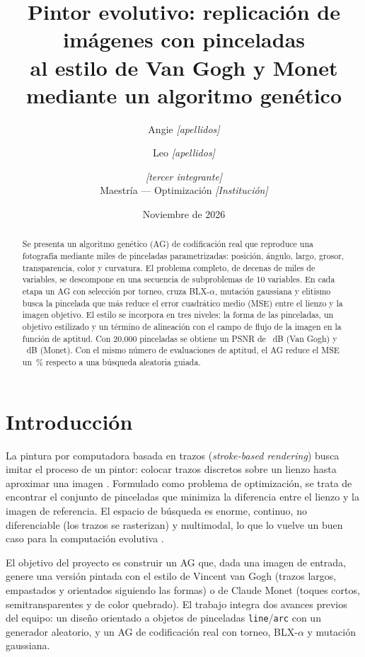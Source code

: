 \documentclass[10pt,letterpaper]{article}
\title{\vspace{-1.2cm}\textbf{Pintor evolutivo: replicación de imágenes con pinceladas\\ al estilo de Van Gogh y Monet mediante un algoritmo genético}}
\author{Angie \textit{[apellidos]} \and Leo \textit{[apellidos]} \and \textit{[tercer integrante]}\\[2pt]
\small Maestría --- Optimización \quad \small\textit{[Institución]}}
\date{\small Noviembre de 2026}
\begin{document}
\maketitle
\vspace{-0.6cm}

\begin{abstract}
\noindent Se presenta un algoritmo genético (AG) de codificación real que reproduce una fotografía mediante miles de pinceladas parametrizadas: posición, ángulo, largo, grosor, transparencia, color y curvatura. El problema completo, de decenas de miles de variables, se descompone en una secuencia de subproblemas de 10 variables. En cada etapa un AG con selección por torneo, cruza BLX-$\alpha$, mutación gaussiana y elitismo busca la pincelada que más reduce el error cuadrático medio (MSE) entre el lienzo y la imagen objetivo. El estilo se incorpora en tres niveles: la forma de las pinceladas, un objetivo estilizado y un término de alineación con el campo de flujo de la imagen en la función de aptitud. Con 20{,}000 pinceladas se obtiene un PSNR de \vgPSNR~dB (Van Gogh) y \moPSNR~dB (Monet). Con el mismo número de evaluaciones de aptitud, el AG reduce el MSE un \mejora\,\% respecto a una búsqueda aleatoria guiada.
\end{abstract}

\section{Introducción}
La pintura por computadora basada en trazos (\emph{stroke-based rendering}) busca imitar el proceso de un pintor: colocar trazos discretos sobre un lienzo hasta aproximar una imagen \cite{haeberli,hertzmann}. Formulado como problema de optimización, se trata de encontrar el conjunto de pinceladas que minimiza la diferencia entre el lienzo y la imagen de referencia. El espacio de búsqueda es enorme, continuo, no diferenciable (los trazos se rasterizan) y multimodal, lo que lo vuelve un buen caso para la computación evolutiva \cite{engelbrecht}.

El objetivo del proyecto es construir un AG que, dada una imagen de entrada, genere una versión pintada con el estilo de Vincent van Gogh (trazos largos, empastados y orientados siguiendo las formas) o de Claude Monet (toques cortos, semitransparentes y de color quebrado). El trabajo integra dos avances previos del equipo: un diseño orientado a objetos de pinceladas \texttt{line}/\texttt{arc} con un generador aleatorio, y un AG de codificación real con torneo, BLX-$\alpha$ y mutación gaussiana.
\end{document}
